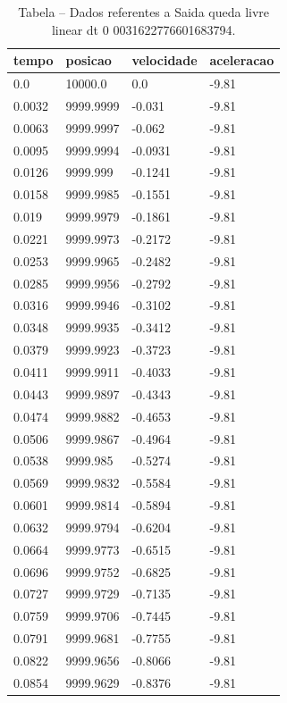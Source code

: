 \begin{table}[H]
\centering
\caption{Tabela – Dados referentes a Saida queda livre linear dt 0 0031622776601683794.}
\label{tab:saida_queda_livre_linear_dt_0_0031622776601683794}
\begin{tabular}{llll}
\toprule
tempo & posicao & velocidade & aceleracao \\
\midrule
0.0 & 10000.0 & 0.0 & -9.81 \\
0.0032 & 9999.9999 & -0.031 & -9.81 \\
0.0063 & 9999.9997 & -0.062 & -9.81 \\
0.0095 & 9999.9994 & -0.0931 & -9.81 \\
0.0126 & 9999.999 & -0.1241 & -9.81 \\
0.0158 & 9999.9985 & -0.1551 & -9.81 \\
0.019 & 9999.9979 & -0.1861 & -9.81 \\
0.0221 & 9999.9973 & -0.2172 & -9.81 \\
0.0253 & 9999.9965 & -0.2482 & -9.81 \\
0.0285 & 9999.9956 & -0.2792 & -9.81 \\
0.0316 & 9999.9946 & -0.3102 & -9.81 \\
0.0348 & 9999.9935 & -0.3412 & -9.81 \\
0.0379 & 9999.9923 & -0.3723 & -9.81 \\
0.0411 & 9999.9911 & -0.4033 & -9.81 \\
0.0443 & 9999.9897 & -0.4343 & -9.81 \\
0.0474 & 9999.9882 & -0.4653 & -9.81 \\
0.0506 & 9999.9867 & -0.4964 & -9.81 \\
0.0538 & 9999.985 & -0.5274 & -9.81 \\
0.0569 & 9999.9832 & -0.5584 & -9.81 \\
0.0601 & 9999.9814 & -0.5894 & -9.81 \\
0.0632 & 9999.9794 & -0.6204 & -9.81 \\
0.0664 & 9999.9773 & -0.6515 & -9.81 \\
0.0696 & 9999.9752 & -0.6825 & -9.81 \\
0.0727 & 9999.9729 & -0.7135 & -9.81 \\
0.0759 & 9999.9706 & -0.7445 & -9.81 \\
0.0791 & 9999.9681 & -0.7755 & -9.81 \\
0.0822 & 9999.9656 & -0.8066 & -9.81 \\
0.0854 & 9999.9629 & -0.8376 & -9.81 \\

\end{tabular}
\end{table}
